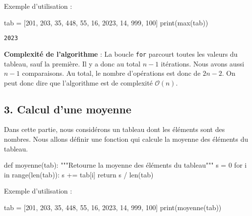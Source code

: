 \documentclass[
  a4paper,
  DIV=11,
  numbers=noendperiod]{scrartcl}
\newenvironment{Shaded}{\begin{snugshade}}{\end{snugshade}}
\newcommand{\BuiltInTok}[1]{\textcolor[rgb]{0.00,0.23,0.31}{#1}}
\newcommand{\CommentTok}[1]{\textcolor[rgb]{0.37,0.37,0.37}{#1}}
\newcommand{\ControlFlowTok}[1]{\textcolor[rgb]{0.00,0.23,0.31}{#1}}
\newcommand{\DecValTok}[1]{\textcolor[rgb]{0.68,0.00,0.00}{#1}}
\newcommand{\KeywordTok}[1]{\textcolor[rgb]{0.00,0.23,0.31}{#1}}
\newcommand{\NormalTok}[1]{\textcolor[rgb]{0.00,0.23,0.31}{#1}}
\newcommand{\OperatorTok}[1]{\textcolor[rgb]{0.37,0.37,0.37}{#1}}
\begin{document}
Exemple d'utilisation :

\begin{Shaded}
\begin{Highlighting}[]
\NormalTok{tab }\OperatorTok{=}\NormalTok{ [}\DecValTok{201}\NormalTok{, }\DecValTok{203}\NormalTok{, }\DecValTok{35}\NormalTok{, }\DecValTok{448}\NormalTok{, }\DecValTok{55}\NormalTok{, }\DecValTok{16}\NormalTok{, }\DecValTok{2023}\NormalTok{, }\DecValTok{14}\NormalTok{, }\DecValTok{999}\NormalTok{, }\DecValTok{100}\NormalTok{]}
\BuiltInTok{print}\NormalTok{(}\BuiltInTok{max}\NormalTok{(tab))}
\end{Highlighting}
\end{Shaded}

\begin{verbatim}
2023
\end{verbatim}

\textbf{Complexité de l'algorithme} : La boucle \texttt{for} parcourt
toutes les valeurs du tableau, sauf la première. Il y a donc au total
\(n-1\) itérations. Nous avons aussi \(n-1\) comparaisons. Au total, le
nombre d'opérations est donc de \(2n-2\). On peut donc dire que
l'algorithme est de complexité \(\mathcal{O}(n)\).

\hypertarget{calcul-dune-moyenne}{%
\subsection{3. Calcul d'une moyenne}\label{calcul-dune-moyenne}}

Dans cette partie, nous considérons un tableau dont les éléments sont
des nombres. Nous allons définir une fonction qui calcule la moyenne des
éléments du tableau.

\begin{Shaded}
\begin{Highlighting}[]
\KeywordTok{def}\NormalTok{ moyenne(tab):}
    \CommentTok{"""Retourne la moyenne des éléments du tableau"""}
\NormalTok{    s }\OperatorTok{=} \DecValTok{0}
    \ControlFlowTok{for}\NormalTok{ i }\KeywordTok{in} \BuiltInTok{range}\NormalTok{(}\BuiltInTok{len}\NormalTok{(tab)):}
\NormalTok{        s }\OperatorTok{+=}\NormalTok{ tab[i]}
    \ControlFlowTok{return}\NormalTok{ s }\OperatorTok{/} \BuiltInTok{len}\NormalTok{(tab)}
\end{Highlighting}
\end{Shaded}

Exemple d'utilisation :

\begin{Shaded}
\begin{Highlighting}[]
\NormalTok{tab }\OperatorTok{=}\NormalTok{ [}\DecValTok{201}\NormalTok{, }\DecValTok{203}\NormalTok{, }\DecValTok{35}\NormalTok{, }\DecValTok{448}\NormalTok{, }\DecValTok{55}\NormalTok{, }\DecValTok{16}\NormalTok{, }\DecValTok{2023}\NormalTok{, }\DecValTok{14}\NormalTok{, }\DecValTok{999}\NormalTok{, }\DecValTok{100}\NormalTok{]}
\BuiltInTok{print}\NormalTok{(moyenne(tab))}
\end{Highlighting}
\end{Shaded}
\end{document}
